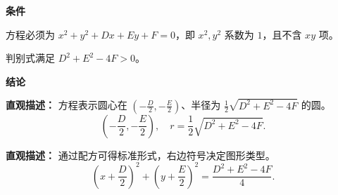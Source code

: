 \begin{statementbox}
	\textbf{\textcolor{CStatement}{条件}}
	\begin{description}[style=nextline, leftmargin=2.8em, labelsep=0.5em, itemsep=0.35em]
		\item[\textbf{\textcolor{CStatement}{条件1（方程规范）：}}]
			方程必须为 $x^2+y^2+Dx+Ey+F=0$，即 $x^2,y^2$ 系数为 $1$，且不含 $xy$ 项。
		\item[\textbf{\textcolor{CStatement}{条件2（判别式正）：}}]
			判别式满足 $D^2+E^2-4F>0$。
	\end{description}
	\textbf{\textcolor{CStatement}{结论}}
	\begin{description}[style=nextline, leftmargin=2.8em, labelsep=0.5em, itemsep=0.35em]
		\item[\textbf{\textcolor{CStatement}{结论一（圆方程）：}}]
			\textbf{\textcolor{CStatement}{直观描述：}}
			方程表示圆心在 $(-\frac{D}{2},-\frac{E}{2})$、半径为 $\frac12\sqrt{D^2+E^2-4F}$ 的圆。
			\[
				\left(-\frac{D}{2},-\frac{E}{2}\right),\quad r=\frac12\sqrt{D^2+E^2-4F}.
			\]
		\item[\textbf{\textcolor{CStatement}{推广结论（配方形式）：}}]
			\textbf{\textcolor{CStatement}{直观描述：}}
			通过配方可得标准形式，右边符号决定图形类型。
			\[
				\left(x+\frac{D}{2}\right)^2+\left(y+\frac{E}{2}\right)^2=\frac{D^2+E^2-4F}{4}.
			\]
	\end{description}

\end{statementbox}
